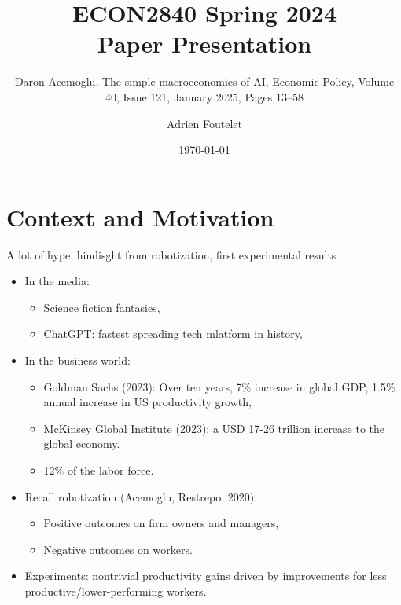 \documentclass{beamer}
\title{ECON2840 Spring 2024\\Paper Presentation}
\subtitle{Daron Acemoglu, The simple macroeconomics of AI, Economic Policy, Volume 40, Issue 121, January 2025, Pages 13–58}
\author{Adrien Foutelet}
\date{\today}
\begin{document}
%
\maketitle
%
\section{Context and Motivation}


\begin{frame}{A lot of hype, hindisght from robotization, first experimental results}

    \begin{itemize}
        \item In the media:
        \begin{itemize}
            \item Science fiction fantasies,
            \item ChatGPT: fastest spreading tech mlatform in history,
        \end{itemize}
        \item In the business world:
        \begin{itemize}
            \item Goldman Sachs (2023): Over ten years, 7\% increase in global GDP, 1.5\% annual increase in US productivity growth,
            \item McKinsey Global Institute (2023): a USD 17-26 trillion increase to the global economy.
            \item 12\% of the labor force.
        \end{itemize}
        \item Recall robotization (Acemoglu, Restrepo, 2020):
        \begin{itemize}
            \item Positive outcomes on firm owners and managers,
            \item Negative outcomes on workers.
        \end{itemize}
        \item Experiments: nontrivial productivity gains driven by improvements for less productive/lower-performing workers.
    \end{itemize}

\end{frame}
\end{document}
